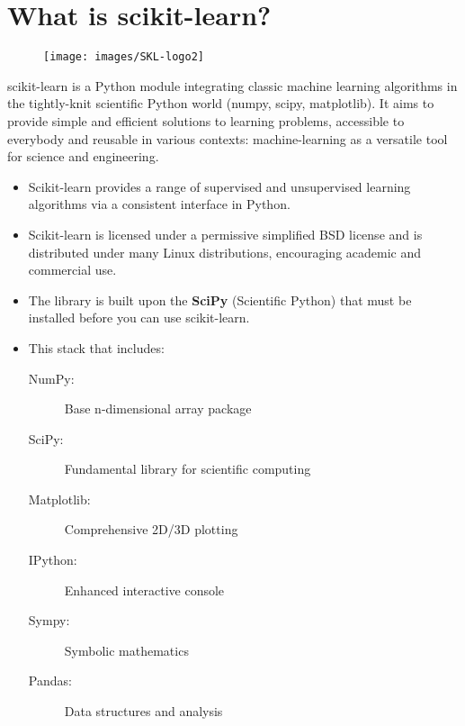 \documentclass[SKL-MASTER.tex]{subfiles}
\begin{document}
\LARGE
\section*{What is scikit-learn?}
\begin{figure}[h!]
\centering
\texttt{[image: images/SKL-logo2]}
\end{figure}

\begin{framed}
\noindent scikit-learn is a Python module integrating classic machine learning algorithms in the tightly-knit scientific
Python world (numpy, scipy, matplotlib). It aims to provide simple and efficient solutions to learning
problems, accessible to everybody and reusable in various contexts: machine-learning as a versatile tool for
science and engineering.
\end{framed}

\begin{itemize}
\item 
Scikit-learn provides a range of supervised and unsupervised learning algorithms via a consistent interface in Python. \item Scikit-learn is licensed under a permissive simplified BSD license and is distributed under many Linux distributions, encouraging academic and commercial use.

\newpage
\item The library is built upon the \textbf{SciPy} (Scientific Python) that must be installed before you can use scikit-learn. 
\item This stack that includes:

\begin{description}
\item[NumPy:] Base n-dimensional array package
\item[SciPy:] Fundamental library for scientific computing
\item[Matplotlib:] Comprehensive 2D/3D plotting
\item[IPython:] Enhanced interactive console
\item[Sympy:] Symbolic mathematics
\item[Pandas:] Data structures and analysis
\end{description}
\end{itemize}{}
\end{document}
